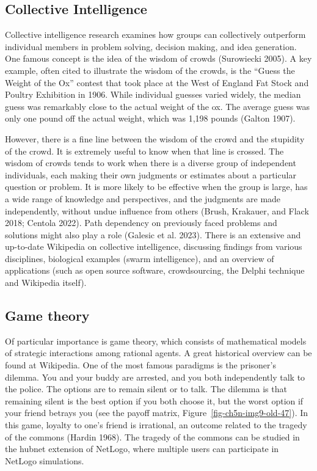 \documentclass[
  a4paper,
  DIV=11,
  numbers=noendperiod,
  oneside]{scrreprt}
\begin{document}
\hypertarget{sec-Collective-Intelligence}{%
\subsection{Collective Intelligence}\label{sec-Collective-Intelligence}}

Collective intelligence research examines how groups can collectively
outperform individual members in problem solving, decision making, and
idea generation. One famous concept is the idea of the wisdom of crowds
(Surowiecki 2005). A key example, often cited to illustrate the wisdom
of the crowds, is the ``Guess the Weight of the Ox'' contest that took
place at the West of England Fat Stock and Poultry Exhibition in 1906.
While individual guesses varied widely, the median guess was remarkably
close to the actual weight of the ox. The average guess was only one
pound off the actual weight, which was 1,198 pounds (Galton 1907).

However, there is a fine line between the wisdom of the crowd and the
stupidity of the crowd. It is extremely useful to know when that line is
crossed. The wisdom of crowds tends to work when there is a diverse
group of independent individuals, each making their own judgments or
estimates about a particular question or problem. It is more likely to
be effective when the group is large, has a wide range of knowledge and
perspectives, and the judgments are made independently, without undue
influence from others (Brush, Krakauer, and Flack 2018; Centola 2022).
Path dependency on previously faced problems and solutions might also
play a role (Galesic et al. 2023). There is an extensive and up-to-date
Wikipedia on collective intelligence, discussing findings from various
disciplines, biological examples (swarm intelligence), and an overview
of applications (such as open source software, crowdsourcing, the Delphi
technique and Wikipedia itself).

\hypertarget{sec-Game-theory}{%
\subsection{Game theory}\label{sec-Game-theory}}

Of particular importance is game theory, which consists of mathematical
models of strategic interactions among rational agents. A great
historical overview can be found at Wikipedia. One of the most famous
paradigms is the prisoner's dilemma. You and your buddy are arrested,
and you both independently talk to the police. The options are to remain
silent or to talk. The dilemma is that remaining silent is the best
option if you both choose it, but the worst option if your friend
betrays you (see the payoff matrix, Figure~\ref{fig-ch5n-img9-old-47}).
In this game, loyalty to one's friend is irrational, an outcome related
to the tragedy of the commons (Hardin 1968). The tragedy of the commons
can be studied in the hubnet extension of NetLogo, where multiple users
can participate in NetLogo simulations.
\end{document}

